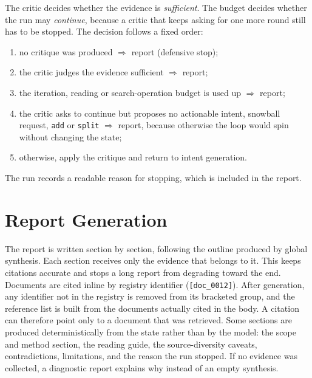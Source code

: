 \documentclass[10pt,a4paper]{article}
\newcommand{\hfont}{\sffamily}
\renewcommand{\paragraph}[1]{%
  \par\vspace{0.35em}{\hfont\bfseries\color{accent}#1}\hspace{0.6em}\ignorespaces}
\newcommand{\code}[1]{\texttt{#1}}
\begin{document}
\paragraph{Termination.} The critic decides whether the evidence is
\emph{sufficient}. The budget decides whether the run may
\emph{continue}, because a critic that keeps asking for one more round
still has to be stopped. The decision follows a fixed order:
\begin{enumerate}[leftmargin=*]
  \item no critique was produced $\Rightarrow$ report (defensive stop);
  \item the critic judges the evidence sufficient $\Rightarrow$ report;
  \item the iteration, reading or search-operation budget is used up
    $\Rightarrow$ report;
  \item the critic asks to continue but proposes no actionable intent,
    snowball request, \code{add} or \code{split} $\Rightarrow$ report,
    because otherwise the loop would spin without changing the state;
  \item otherwise, apply the critique and return to intent generation.
\end{enumerate}
The run records a readable reason for stopping, which is included in the
report.

\section{Report Generation}
\label{sec:report}

The report is written section by section, following the outline produced by
global synthesis. Each section receives only the evidence that belongs to
it. This keeps citations accurate and stops a long report from degrading
toward the end. Documents are cited inline by registry identifier
(\code{[doc\_0012]}). After generation, any identifier not in the registry
is removed from its bracketed group, and the reference list is built from
the documents actually cited in the body. A citation can therefore point
only to a document that was retrieved. Some sections are produced
deterministically from the state rather than by the model: the scope and
method section, the reading guide, the source-diversity caveats,
contradictions, limitations, and the reason the run stopped. If no evidence
was collected, a diagnostic report explains why instead of an empty
synthesis.
\end{document}

